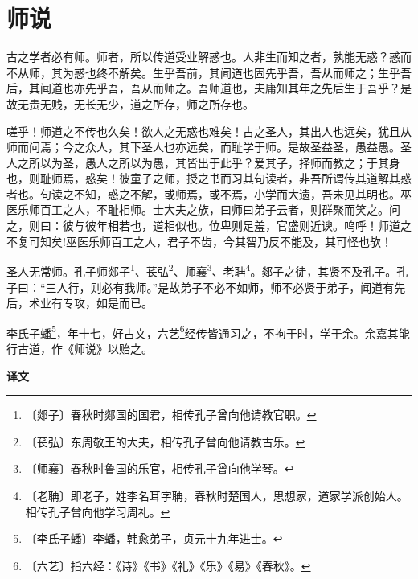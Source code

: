 \documentclass[12pt,UTF-8,openany,a4]{ctexbook}
\begin{document}
\chapter{师说}

\begin{large}
    
    古之学者必有师。师者，所以传道受业解惑也。人非生而知之者，孰能无惑？惑而不从师，其为惑也终不解矣。生乎吾前，其闻道也固先乎吾，吾从而师之；生乎吾后，其闻道也亦先乎吾，吾从而师之。吾师道也，夫庸知其年之先后生于吾乎？是故无贵无贱，无长无少，道之所存，师之所存也。
    
    嗟乎！师道之不传也久矣！欲人之无惑也难矣！古之圣人，其出人也远矣，犹且从师而问焉；今之众人，其下圣人也亦远矣，而耻学于师。是故圣益圣，愚益愚。圣人之所以为圣，愚人之所以为愚，其皆出于此乎？爱其子，择师而教之；于其身也，则耻师焉，惑矣！彼童子之师，授之书而习其句读者，非吾所谓传其道解其惑者也。句读之不知，惑之不解，或师焉，或不焉，小学而大遗，吾未见其明也。巫医乐师百工之人，不耻相师。士大夫之族，曰师曰弟子云者，则群聚而笑之。问之，则曰：彼与彼年相若也，道相似也。位卑则足羞，官盛则近谀。呜呼！师道之不复可知矣!巫医乐师百工之人，君子不齿，今其智乃反不能及，其可怪也欤！
    
    圣人无常师。孔子师郯子\footnote{〔郯子〕\yiwen 春秋时郯国的国君，相传孔子曾向他请教官职。}、苌弘\footnote{〔苌弘〕\yiwen 东周敬王的大夫，相传孔子曾向他请教古乐。}、师襄\footnote{〔师襄〕\yiwen 春秋时鲁国的乐官，相传孔子曾向他学琴。}、老聃\footnote{〔老聃〕\yiwen 即老子，姓李名耳字聃，春秋时楚国人，思想家，道家学派创始人。相传孔子曾向他学习周礼。}。郯子之徒，其贤不及孔子。孔子曰：“三人行，则必有我师。”是故弟子不必不如师，师不必贤于弟子，闻道有先后，术业有专攻，如是而已。
    
    李氏子蟠\footnote{〔李氏子蟠〕\yiwen 李蟠，韩愈弟子，贞元十九年进士。}，年十七，好古文，六艺\footnote{〔六艺〕\yiwen 指六经：《诗》《书》《礼》《乐》《易》《春秋》。}经传皆通习之，不拘于时，学于余。余嘉其能行古道，作《师说》以贻之。
\end{large}


\newpage

\begin{Large}
    \noindent\textbf{译文}
\end{Large}


\vspace{1em}
\end{document}
